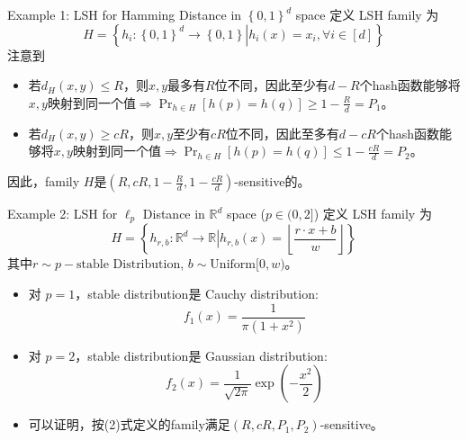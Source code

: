 \begin{frame}{Example 1: LSH for Hamming Distance in $\left\{ 0, 1 \right\}^{d} $ space}
    定义 LSH family 为 
        \[
            H = \left\{ h_i : \left. \left\{ 0, 1 \right\} ^{d} \to \left\{ 0, 1 \right\} \right| h_i(x) = x_i, \forall i \in [d] \right\} 
        \]
        注意到
    \begin{itemize}
        \item 若$d_H(x, y) \leqslant R$，则$x, y$最多有$R$位不同，因此至少有$d-R$个hash函数能够将$x, y$映射到同一个值$\Rightarrow \Pr_{h \in H}[h(p) = h(q)] \geq 1-\frac{R}{d} = P_1$。
        \item 若$d_H(x, y) \geqslant cR$，则$x, y$至少有$cR$位不同，因此至多有$d-cR$个hash函数能够将$x, y$映射到同一个值$\Rightarrow \Pr_{h \in H}[h(p) = h(q)] \leq 1- \frac{cR}{d} = P_2$。
    \end{itemize}
    因此，family $H$是$(R, cR, 1-\frac{R}{d}, 1-\frac{cR}{d})$-sensitive的。
    
\end{frame}

\begin{frame}{Example 2: LSH for $\ell_p$ Distance in $\mathbb{R}^{d} $ space ($p \in (0, 2]$)}
    定义 LSH family 为 
        \[
            H = \left\{ h_{r, b} : \left. \mathbb{R}^{d} \to \mathbb{R} \right| h_{r, b}(x) = \left\lfloor \frac{r \cdot x + b}{w} \right\rfloor \right\}\tag{2}
        \]
        其中$r \sim p-\text{stable Distribution}$, $b \sim \text{Uniform}[0, w)$。

    \begin{itemize}
        \item 对 $p=1$，stable distribution是 Cauchy distribution:
        \[
            f_1(x) = \frac{1}{\pi(1+x^2)}
        \]
        \item 对 $p=2$，stable distribution是 Gaussian distribution:
        \[
            f_2(x) = \frac{1}{\sqrt{2\pi}} \exp(-\frac{x^2}{2})
        \]
        \item 可以证明，按(2)式定义的family满足$(R, cR, P_1, P_2)$-sensitive。
    \end{itemize}
    
\end{frame}

